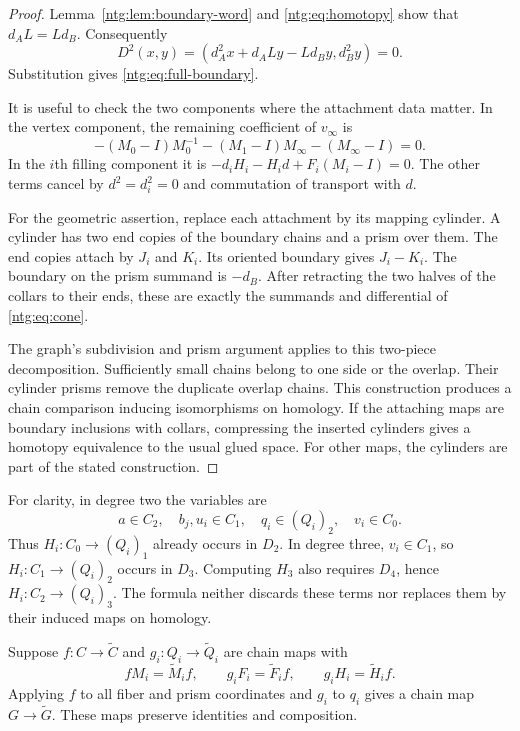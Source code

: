 \begin{proof}
Lemma~\ref{ntg:lem:boundary-word} and \eqref{ntg:eq:homotopy} show that
$d_AL=Ld_B$. Consequently
\[
 D^2(x,y)=(d_A^2x+d_ALy-Ld_By,d_B^2y)=0.
\]
Substitution gives \eqref{ntg:eq:full-boundary}.

It is useful to check the
two components where the attachment data matter. In the vertex
component, the remaining coefficient of $v_\infty$ is
\[
 -(M_0-I)M_0^{-1}-(M_1-I)M_\infty-(M_\infty-I)=0.
\]
In the $i$th filling component it is
$-d_iH_i-H_id+F_i(M_i-I)=0$. The other terms cancel by
$d^2=d_i^2=0$ and commutation of transport with $d$.

For the geometric assertion, replace each attachment by its mapping
cylinder. A cylinder has two end copies of the boundary chains and a
prism over them. The end copies attach by $J_i$ and $K_i$. Its oriented
boundary gives $J_i-K_i$. The boundary on the prism summand is $-d_B$.
After retracting the two halves of the collars to their ends, these are
exactly the summands and differential of \eqref{ntg:eq:cone}.

The graph's subdivision and prism argument applies to this two-piece
decomposition. Sufficiently small chains belong to one side or the overlap.
Their cylinder prisms remove the duplicate overlap chains.
This construction produces a chain comparison inducing isomorphisms on homology. If the attaching maps are boundary inclusions
with collars, compressing the inserted cylinders gives a homotopy
equivalence to the usual glued space. For other maps, the cylinders
are part of the stated construction.
\end{proof}

For clarity, in degree two the variables are
\[
 a\in C_2,\quad b_j,u_i\in C_1,\quad q_i\in(Q_i)_2,
 \quad v_i\in C_0.
\]
Thus $H_i:C_0\to(Q_i)_1$ already occurs in $D_2$. In degree three,
$v_i\in C_1$, so $H_i:C_1\to(Q_i)_2$ occurs in $D_3$.
Computing $H_3$ also requires $D_4$, hence
$H_i:C_2\to(Q_i)_3$. The formula neither discards these terms nor
replaces them by their induced maps on homology.

\begin{proposition}\label{ntg:prop:natural}
Suppose $f:C\to\widetilde C$ and $g_i:Q_i\to\widetilde Q_i$ are
chain maps with
\[
 fM_i=\widetilde M_if,\qquad
 g_iF_i=\widetilde F_if,\qquad
 g_iH_i=\widetilde H_if.
\]
Applying $f$ to all fiber and prism coordinates and $g_i$ to $q_i$
gives a chain map $G\to\widetilde G$. These maps preserve identities
and composition.
\end{proposition}


